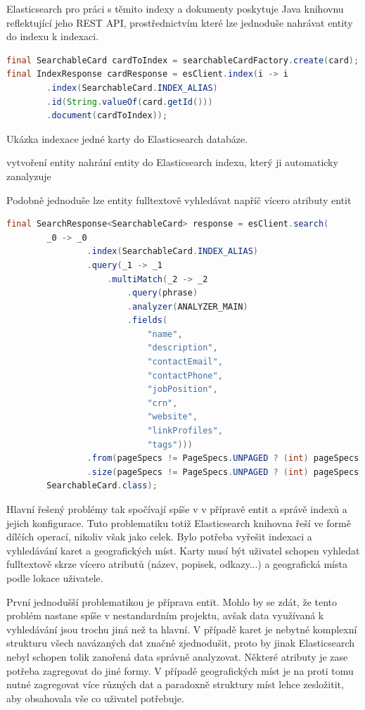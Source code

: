 		Elasticsearch pro práci s těmito indexy a dokumenty poskytuje Java knihovnu reflektující jeho \ac{REST} \ac{API},
		prostřednictvím které lze jednoduše nahrávat entity do indexu k indexaci.

		\begin{lstlisting}[language=Java]
final SearchableCard cardToIndex = searchableCardFactory.create(card);
final IndexResponse cardResponse = esClient.index(i -> i
		.index(SearchableCard.INDEX_ALIAS)
		.id(String.valueOf(card.getId()))
		.document(cardToIndex));
		\end{lstlisting}
		Ukázka indexace jedné karty do Elasticsearch databáze. %

		vytvoření entity
		nahrání entity do Elasticsearch indexu, který ji automaticky zanalyzuje

		Podobně jednoduše lze entity fulltextově vyhledávat napříč vícero atributy entit
		\begin{lstlisting}[language=Java]
final SearchResponse<SearchableCard> response = esClient.search(
		_0 -> _0
				.index(SearchableCard.INDEX_ALIAS)
				.query(_1 -> _1
					.multiMatch(_2 -> _2
						.query(phrase)
						.analyzer(ANALYZER_MAIN)
						.fields(
							"name",
							"description",
							"contactEmail",
							"contactPhone",
							"jobPosition",
							"crn",
							"website",
							"linkProfiles",
							"tags")))
				.from(pageSpecs != PageSpecs.UNPAGED ? (int) pageSpecs.getOffset() : null)
				.size(pageSpecs != PageSpecs.UNPAGED ? (int) pageSpecs.getSize() : null),
		SearchableCard.class);
		\end{lstlisting}

		Hlavní řešený problémy tak spočívají spíše v v přípravě entit a správě indexů a jejich konfigurace.
		Tuto problematiku totiž Elasticsearch knihovna řeší ve formě dílčích operací, nikoliv však jako celek.
		Bylo potřeba vyřešit indexaci a vyhledávání karet a geografických míst.
		Karty musí být uživatel schopen vyhledat fulltextově skrze vícero atributů (název, popisek, odkazy...) a geografická
		místa podle lokace uživatele.

		První jednodušší problematikou je příprava entit.
		Mohlo by se zdát, že tento problém nastane spíše v nestandardním projektu, avšak data využívaná k vyhledávání
		jsou trochu jiná než ta hlavní.
		V případě karet je nebytné komplexní strukturu všech navázaných dat značně zjednodušit, proto by jinak Elasticsearch
		nebyl schopen tolik zanořená data správně analyzovat.
		Některé atributy je zase potřeba zagregovat do jiné formy.
		V případě geografických míst je na proti tomu nutné zagregovat více různých dat a paradoxně struktury míst lehce
		zesložitit, aby obsahovala vše co uživatel potřebuje.

